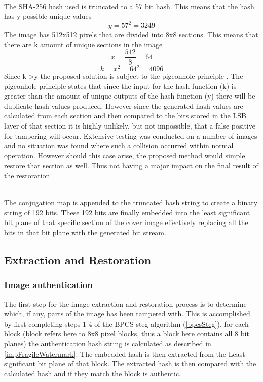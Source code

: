 \documentclass[12pt]{article}
\begin{document}
\hspace{0pt} \\
The SHA-256 hash used is truncated to a 57 bit hash. 
This means that the hash has y possible unique values 
\[ y = 57^2 = 3249 \]
The image has 512x512 pixels that are divided into 8x8 sections.
This means that there are k amount of unique sections in the image
\[x = \frac{512}{8} = 64 \]
\[k = x^2 =64^2 = 4096 \]
Since k \textgreater y the proposed solution is subject to the pigeonhole principle \cite{cook1976short}.
The pigeonhole principle states that since the input for the hash function (k) is greater than the amount of unique outputs of the hash function (y) there will be duplicate hash values produced.
However since the generated hash values are calculated from each section and then compared to the bits stored in the LSB layer of that section it is highly unlikely, but not impossible, that a false positive for tampering will occur.
Extensive testing was conducted on a number of images and no situation was found where such a collision occurred within normal operation.
However should this case arise, the proposed method would simple restore that section as well.
Thus not having a major impact on the final result of the restoration.

\hspace{0pt} \\
The conjugation map is appended to the truncated hash string to create a binary string of 192 bits.
These 192 bits are finally embedded into the least significant bit plane of that specific section of the cover image effectively replacing all the bits in that bit plane with the generated bit stream.

\subsection{Extraction and Restoration}
\label{extractRestore}
\subsubsection{Image authentication}
The first step for the image extraction and restoration process is to determine which, if any, parts of the image has been tampered with.
This is accomplished by first completing steps 1-4 of the BPCS steg algorithm (\ref{bpcsSteg}).
for each block (block refers here to 8x8 pixel blocks, thus a block here contains all 8 bit planes) the authentication hash string is calculated as described in \ref{impFragileWatermark}. 
The embedded hash is then extracted from the Least significant bit plane of that block.
The extracted hash is then compared with the calculated hash and if they match the block is authentic.
\end{document}
